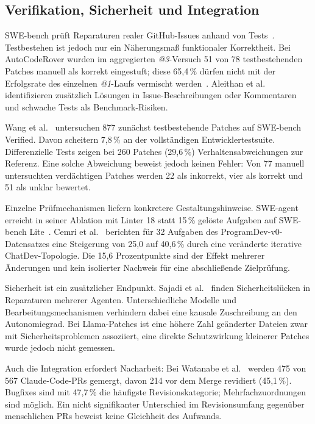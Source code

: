 \documentclass[conference]{IEEEtran}
\begin{document}
\subsection{Verifikation, Sicherheit und Integration}
SWE-bench prüft Reparaturen realer GitHub-Issues anhand von Tests~\cite{jimenez2024swebench}. Testbestehen ist jedoch nur ein Näherungsmaß funktionaler Korrektheit. Bei AutoCodeRover wurden im aggregierten \emph{@3}-Versuch 51 von 78 testbestehenden Patches manuell als korrekt eingestuft; diese 65,4\,\% dürfen nicht mit der Erfolgsrate des einzelnen \emph{@1}-Laufs vermischt werden~\cite{zhang2024autocoderover}. Aleithan et al.~\cite{aleithan2024swebenchplus} identifizieren zusätzlich Lösungen in Issue-Beschreibungen oder Kommentaren und schwache Tests als Benchmark-Risiken.

Wang et al.~\cite{wang2026solvedissues} untersuchen 877 zunächst testbestehende Patches auf SWE-bench Verified. Davon scheitern 7,8\,\% an der vollständigen Entwicklertestsuite. Differenzielle Tests zeigen bei 260 Patches (29,6\,\%) Verhaltensabweichungen zur Referenz. Eine solche Abweichung beweist jedoch keinen Fehler: Von 77 manuell untersuchten verdächtigen Patches werden 22 als inkorrekt, vier als korrekt und 51 als unklar bewertet.

Einzelne Prüfmechanismen liefern konkretere Gestaltungshinweise. SWE-agent erreicht in seiner Ablation mit Linter 18 statt 15\,\% gelöste Aufgaben auf SWE-bench Lite~\cite{yang2024sweagent}. Cemri et al.~\cite{cemri2025mast} berichten für 32 Aufgaben des ProgramDev-v0-Datensatzes eine Steigerung von 25,0 auf 40,6\,\% durch eine veränderte iterative ChatDev-Topologie. Die 15,6 Prozentpunkte sind der Effekt mehrerer Änderungen und kein isolierter Nachweis für eine abschließende Zielprüfung.

Sicherheit ist ein zusätzlicher Endpunkt. Sajadi et al.~\cite{sajadi2025patchsecurity} finden Sicherheitslücken in Reparaturen mehrerer Agenten. Unterschiedliche Modelle und Bearbeitungsmechanismen verhindern dabei eine kausale Zuschreibung an den Autonomiegrad. Bei Llama-Patches ist eine höhere Zahl geänderter Dateien zwar mit Sicherheitsproblemen assoziiert, eine direkte Schutzwirkung kleinerer Patches wurde jedoch nicht gemessen.

Auch die Integration erfordert Nacharbeit: Bei Watanabe et al.~\cite{watanabe2025agenticprs} werden 475 von 567 Claude-Code-PRs gemergt, davon 214 vor dem Merge revidiert (45,1\,\%). Bugfixes sind mit 47,7\,\% die häufigste Revisionskategorie; Mehrfachzuordnungen sind möglich. Ein nicht signifikanter Unterschied im Revisionsumfang gegenüber menschlichen PRs beweist keine Gleichheit des Aufwands.
\end{document}
